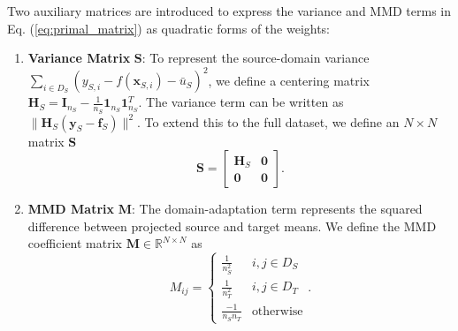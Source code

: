\documentclass[a4paper]{cas-sc}
\begin{document}
Two auxiliary matrices are introduced to express the variance and MMD terms in Eq. (\ref{eq:primal_matrix}) as quadratic forms of the weights:
\begin{enumerate}
    \item \textbf{Variance Matrix} $\mathbf{S}$: To represent the source-domain variance $\sum_{i \in D_S} (y_{S,i} - f(\boldsymbol{x}_{S,i}) - \bar{u}_S)^2$, we define a centering matrix $\boldsymbol{H}_S = \boldsymbol{I}_{n_S} - \frac{1}{n_S} \boldsymbol{1}_{n_S} \boldsymbol{1}_{n_S}^T$. The variance term can be written as $\| \boldsymbol{H}_S (\boldsymbol{y}_S - \boldsymbol{f}_S) \|^2$. To extend this to the full dataset, we define an $N \times N$ matrix $\mathbf{S}$
    \begin{equation}
    \label{eq:matrix_S}
    \mathbf{S} = \begin{bmatrix} \boldsymbol{H}_S & \mathbf{0} \\ \mathbf{0} & \mathbf{0} \end{bmatrix}.
    \end{equation}
    \item \textbf{MMD Matrix} $\mathbf{M}$: The domain-adaptation term represents the squared difference between projected source and target means. We define the MMD coefficient matrix $\mathbf{M} \in \mathbb{R}^{N \times N}$ as
    \begin{equation}
    \label{eq:matrix_M}
    M_{ij} = \begin{cases} \frac{1}{n_S^2} & i,j \in D_S \\ \frac{1}{n_T^2} & i,j \in D_T \\ \frac{-1}{n_S n_T} & \text{otherwise} \end{cases}.
    \end{equation}
\end{enumerate}
\end{document}
